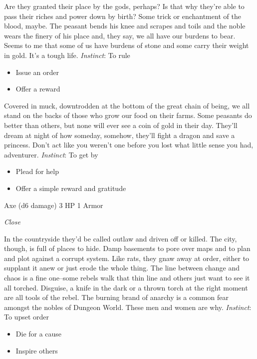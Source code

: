 \HRule
{} 

\HRule
Are they granted their place by the gods, perhaps? Is that why they're able to pass their riches and power down by birth? Some trick or enchantment of the blood, maybe. The peasant bends his knee and scrapes and toils and the noble wears the finery of his place and, they say, we all have our burdens to bear. Seems to me that some of us have burdens of stone and some carry their weight in gold. It's a tough life. \emph{Instinct}: To rule
\begin{itemize}
\item Issue an order
\item Offer a reward
\end{itemize}

\HRule
{} 

\HRule
Covered in muck, downtrodden at the bottom of the great chain of being, we all stand on the backs of those who grow our food on their farms. Some peasants do better than others, but none will ever see a coin of gold in their day. They'll dream at night of how someday, somehow, they'll fight a dragon and save a princess. Don't act like you weren't one before you lost what little sense you had, adventurer. \emph{Instinct}: To get by
\begin{itemize}
\item Plead for help
\item Offer a simple reward and gratitude
\end{itemize}
\newpage
\HRule
{}

Axe (d6 damage)\hspace*{\fill} 3 HP 1 Armor

\emph{Close}

\HRule
In the countryside they'd be called outlaw and driven off or killed. The city, though, is full of places to hide. Damp basements to pore over maps and to plan and plot against a corrupt system. Like rats, they gnaw away at order, either to supplant it anew or just erode the whole thing. The line between change and chaos is a fine one--some rebels walk that thin line and others just want to see it all torched. Disguise, a knife in the dark or a thrown torch at the right moment are all tools of the rebel. The burning brand of anarchy is a common fear amongst the nobles of Dungeon World. These men and women are why. \emph{Instinct}: To upset order
\begin{itemize}
\item Die for a cause
\item Inspire others
\end{itemize}

